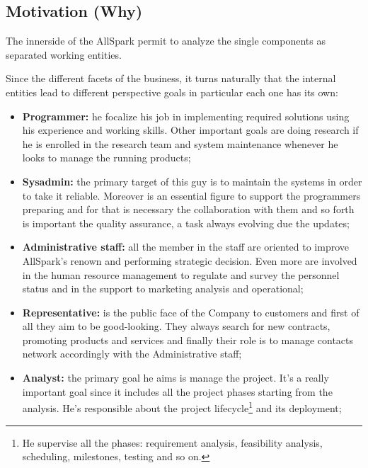 \subsection{Motivation (Why)}
\label{subsec:enterprise[Motivation]}
The innerside of the AllSpark permit to analyze the single components as separated working entities.


Since the different facets of the business, it turns naturally that the internal entities lead to different perspective goals in particular each one has its own:
\begin{itemize}
 \item {\bf Programmer:} he focalize his job in implementing required solutions using his experience and working skills. Other important goals are doing research if he is enrolled in the research team and system maintenance whenever he looks to manage the running products;
 \item {\bf Sysadmin:} the primary target of this guy is to maintain the systems in order to take it reliable. Moreover is an essential figure to support the programmers preparing and for that is necessary the collaboration with them and so forth is important the quality assurance, a task always evolving due the updates;
 \item {\bf Administrative staff:} all the member in the staff are oriented to improve AllSpark's renown and performing strategic decision. Even more are involved in the human resource management to regulate and survey the personnel status and in the support to marketing analysis and operational;
 \item {\bf Representative:} is the public face of the Company to customers and first of all they aim to be good-looking. They always search for new  contracts, promoting products and services and finally their role is to manage contacts network accordingly with the Administrative staff;
 \item {\bf Analyst:} the primary goal he aims is manage the project. It's a really important goal since it includes all the project phases starting from the analysis. He's responsible about the project lifecycle\footnote{He supervise all the phases: requirement analysis, feasibility analysis, scheduling, milestones, testing and so on.} and its deployment;
\end{itemize}



